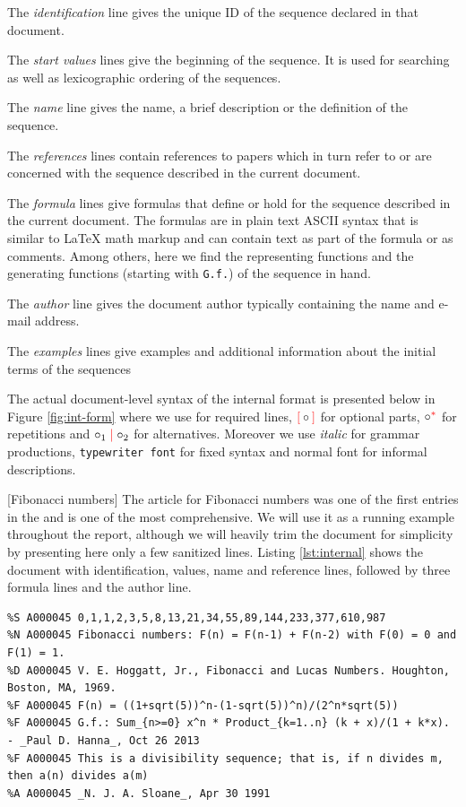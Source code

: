 \begin{compactenum}
 \item The \emph{identification} line gives the unique ID of the sequence declared in that document. 
 \item The \emph{start values} lines give the beginning of the sequence. It is used for searching as 
well as lexicographic ordering of the sequences.
 \item The \emph{name} line gives the name, a brief description or the definition of the sequence.
 \item The \emph{references} lines contain references to papers which in turn refer to or are concerned with the 
 sequence described in the current document.
 \item The \emph{formula} lines give formulas that define or hold for the sequence described in the current document. 
 The formulas are in plain text ASCII syntax that is similar to {\LaTeX} math markup and can contain text as 
 part of the formula or as comments. Among others, here we find the representing functions and the generating
 functions (starting with \texttt{G.f.}) of the sequence in hand.
 \item The \emph{author} line gives the document author typically containing the name and e-mail address.
 \item The \emph{examples} lines give examples and additional information about the initial terms of the sequences
\end{compactenum}

The actual document-level syntax of the internal format is presented below in Figure \ref{fig:int-form} where
we use \req{$\circ$} for required lines, $\opt{\circ}$ for optional parts, $\circ^\rep$ for repetitions and $\circ_1 
\alt \circ_2$ for alternatives. Moreover we use \textit{italic} for grammar productions, \texttt{typewriter font} for 
fixed syntax and normal font for informal descriptions.

[Fibonacci numbers]\label{ex:internal}
  The article for Fibonacci numbers \cite{oeis-fib} was one of the first entries in the
  \oeis and is one of the most comprehensive.  We will use it as a running example
  throughout the report, although we will heavily trim the document for simplicity by
  presenting here only a few sanitized lines. Listing
  \ref{lst:internal} shows the document with identification, values, name and reference
  lines, followed by three formula lines and the author line.

\begin{lstlisting}[caption=A000045,label=lst:internal,basicstyle=\scriptsize\sf]
%I A000045 M0692 N0256
%S A000045 0,1,1,2,3,5,8,13,21,34,55,89,144,233,377,610,987
%N A000045 Fibonacci numbers: F(n) = F(n-1) + F(n-2) with F(0) = 0 and F(1) = 1.
%D A000045 V. E. Hoggatt, Jr., Fibonacci and Lucas Numbers. Houghton, Boston, MA, 1969.
%F A000045 F(n) = ((1+sqrt(5))^n-(1-sqrt(5))^n)/(2^n*sqrt(5))
%F A000045 G.f.: Sum_{n>=0} x^n * Product_{k=1..n} (k + x)/(1 + k*x). - _Paul D. Hanna_, Oct 26 2013
%F A000045 This is a divisibility sequence; that is, if n divides m, then a(n) divides a(m)
%A A000045 _N. J. A. Sloane_, Apr 30 1991
\end{lstlisting}



